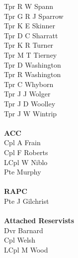 \begin{multicols}{2}
  Tpr R W Spann \\
  Tpr G R J Sparrow \\
  Tpr K E Skinner \\
  Tpr D C Sharratt \\
  Tpr K R Turner \\
  Tpr M T Tierney \\
  Tpr D Washington \\
  Tpr R Washington \\
  Tpr C Whyborn \\
  Tpr J J Wolger \\
  Tpr J D Woolley \\
  Tpr J W Wintrip \\
  \\
  \textbf{ACC} \\
  Cpl A Frain \\
  Cpl F Roberts \\
  LCpl W Niblo \\
  Pte Murphy \\
  \\
  \textbf{RAPC} \\
  Pte J Gilchrist \\
  \\
  \textbf{Attached Reservists} \\
  Dvr Barnard \\
  Cpl Welsh \\
  LCpl M Wood \\
\end{multicols}
